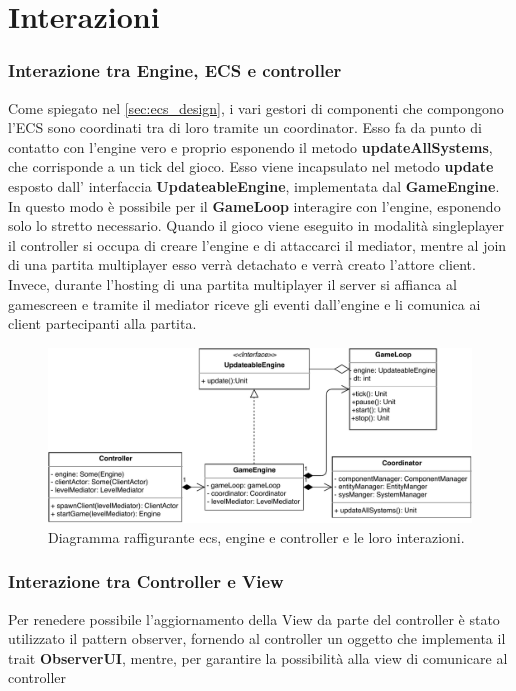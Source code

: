 \section{Interazioni}
\label{sec:interactions_design}

\subsubsection{Interazione tra Engine, ECS e controller}
Come spiegato nel \ref{sec:ecs_design}, i vari gestori di componenti che compongono l'ECS sono coordinati tra di loro tramite un coordinator. Esso fa da punto di contatto con l'engine vero e proprio esponendo il metodo \textbf{updateAllSystems}, che corrisponde a un tick del gioco. Esso viene incapsulato nel metodo \textbf{update} esposto dall' interfaccia \textbf{UpdateableEngine}, implementata dal \textbf{GameEngine}. In questo modo è possibile per il \textbf{GameLoop} interagire con l'engine, esponendo solo lo stretto necessario.
Quando il gioco viene eseguito in modalità singleplayer il controller si occupa di creare l'engine e di attaccarci il mediator, mentre al join di una partita multiplayer esso verrà detachato e verrà creato l'attore client. Invece, durante l'hosting di una partita multiplayer il server si affianca al gamescreen e tramite il mediator riceve gli eventi dall'engine e li comunica ai client partecipanti alla partita.
\begin{figure}[H]
	\centering
	\includegraphics[width=\columnwidth]{drawio/ECS-engine-controller/ecs-engine-controller.pdf}
	\caption{Diagramma raffigurante ecs, engine e controller e le loro interazioni.}
	\label{fig:ecs-engine-controller}
\end{figure}



\subsubsection{Interazione tra Controller e View}
Per renedere possibile l'aggiornamento della View da parte del controller è stato utilizzato il pattern observer, fornendo al controller un oggetto che implementa il trait \textbf{ObserverUI}, mentre, per garantire la possibilità alla view di comunicare al controller 




